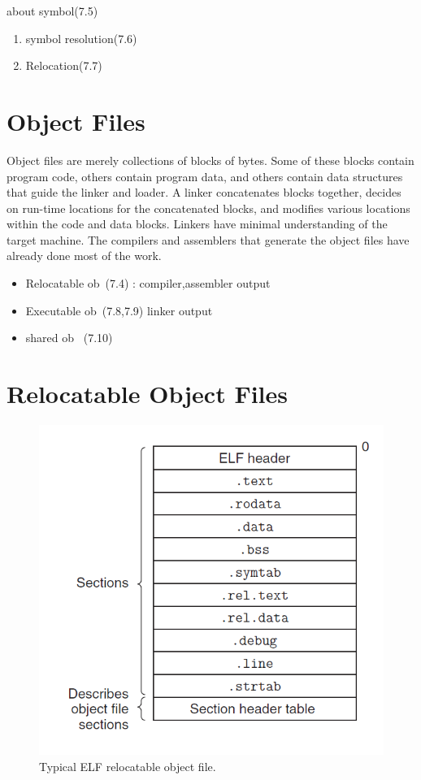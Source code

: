 about symbol(7.5)
\begin{enumerate}
    \item symbol resolution(7.6)
    \item Relocation(7.7)
\end{enumerate}

\section{Object Files}

Object files are merely collections of blocks
of bytes. Some of these blocks contain program code, others contain program
data, and others contain data structures that guide the linker and loader. A linker
concatenates blocks together, decides on run-time locations for the concatenated
blocks, and modifies various locations within the code and data blocks. Linkers
have minimal understanding of the target machine. The compilers and assemblers
that generate the object files have already done most of the work.


\begin{itemize}
    \item Relocatable ob~(7.4) : compiler,assembler output
    \item Executable ob~(7.8,7.9) linker output
    \item shared ob~ (7.10)
\end{itemize}



\section{Relocatable Object Files}


\begin{figure}[h!]
    \centering
    \includegraphics[scale=0.5]{pic/section7/pic2.png}
    \caption{Typical ELF relocatable object file.}
\end{figure}


